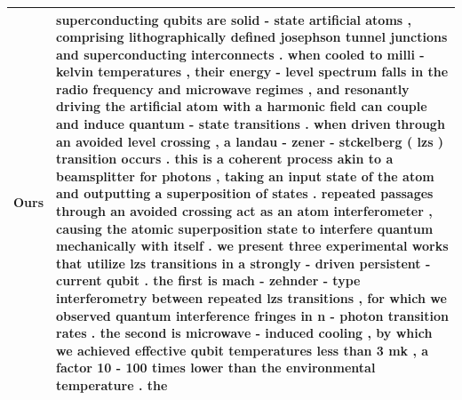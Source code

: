 \begin{table}[h!]
\begin{tabular}{c|p{}}
  Ours & superconducting qubits are solid - state artificial atoms , comprising lithographically defined josephson tunnel junctions and superconducting interconnects . when cooled to milli - kelvin temperatures , their energy - level spectrum falls in the radio frequency and microwave regimes , and resonantly driving the artificial atom with a harmonic field can couple and induce quantum - state transitions . when driven through an avoided level crossing , a landau - zener - stckelberg ( lzs ) transition occurs . this is a coherent process akin to a beamsplitter for photons , taking an input state of the atom and outputting a superposition of states . repeated passages through an avoided crossing act as an atom interferometer , causing the atomic superposition state to interfere quantum mechanically with itself . we present three experimental works that utilize lzs transitions in a strongly - driven persistent - current qubit . the first is mach - zehnder - type interferometry between repeated lzs transitions , for which we observed quantum interference fringes in n - photon transition rates . the second is microwave - induced cooling , by which we achieved effective qubit temperatures less than 3 mk , a factor 10 - 100 times lower than the environmental temperature . the \\\hline
  

\end{tabular}
\end{table}
